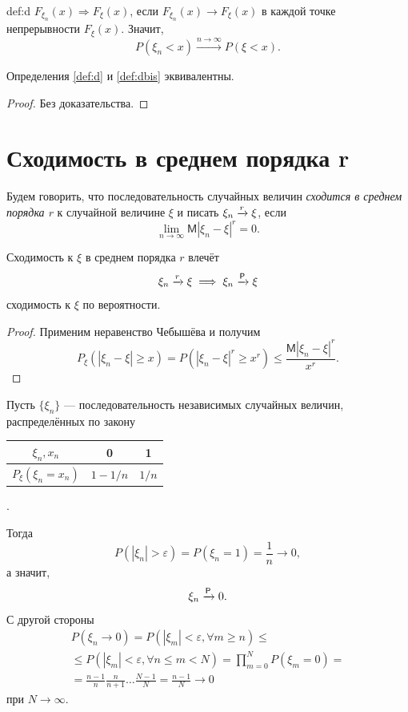 \begin{dfnbis}{def:d}
	\label{def:dbis}
  $F_{\xi_n} (x) \Rightarrow F_\xi(x)$, если $F_{\xi_n}(x) \to F_\xi(x)$ в
	каждой точке непрерывности $F_\xi(x)$. Значит,
\[
	P(\xi_n < x) \xrightarrow[]{n\to\infty} P(\xi<x).
\]
\end{dfnbis}

\begin{theorem}
	Определения {\rm \ref{def:d}} и {\rm \ref{def:dbis}} эквивалентны.
\end{theorem}
\begin{proof} 
	Без доказательства. %
\end{proof}



\section{Сходимость в среднем порядка r}
\begin{definition}
	Будем говорить, что последовательность случайных величин \emph{сходится в
	среднем порядка $ r $} к случайной величине $ \xi $ и писать $ \xi_n \xrightarrow[]{r} \xi
	$, если  
	\[
	\lim_{n\to\infty}\mathsf M |\xi_n - \xi|^r = 0.
	\]
	
\end{definition}

\begin{utv}
	Сходимость к $ \xi $ в среднем порядка $ r $ влечёт
	\[
		\xi_n\xrightarrow[]{r}\xi \implies \xi_n \xrightarrow[]{\mathsf P} \xi
	\]
	сходимость к $ \xi $ по вероятности.
\end{utv}
\begin{proof}
	Применим неравенство Чебышёва и получим 
	\[
			P_\xi(|\xi_n - \xi| \geqslant x) = P (|\xi_n - \xi|^r \geqslant x^r )
			\leqslant \frac{\mathsf M |\xi_n - \xi|^r}{x^r}.
	\]
\end{proof}

\begin{ex}[факультативно]
	Пусть $ \{\xi_n\} $ --- последовательность независимых случайных величин,
	распределённых по закону
	\begin{table}[h!]
		\centering
	\begin{tabular}{|c|c|c|}
		\hline
		$ \xi_n , x_n $ &0 &1 \\\hline
		$ P_\xi(\xi_n = x_n) $ & $ 1 - 1/n $ & $ 1/n $\\\hline
	\end{tabular}.
\end{table}

Тогда  
\[
		P(|\xi_n| > \varepsilon) = P(\xi_n = 1) = \frac{1}{n} \to 0,
\]
а значит, 
\[
		\xi_n \xrightarrow[]{\mathsf P} 0.
\]
С другой стороны
\begin{multline*}
	P(\xi_n \to 0) = P(|\xi_m| < \varepsilon, \forall m \geqslant n) \leqslant \\
	\leqslant P(|\xi_m| < \varepsilon, \forall n \leqslant m < N) = \prod_{m=0}^N
	P(\xi_m = 0) = \\
	= \frac{n-1}{n}\frac{n}{n+1}\ldots
	\frac{N-1}{N} = \frac{n-1}{N} \to 0
\end{multline*}
при $ N \to \infty $.
\end{ex}


